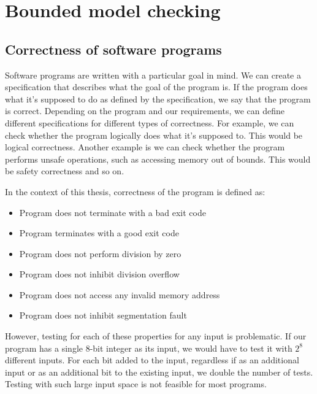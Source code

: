 \documentclass[12pt]{article}
\begin{document}
\section{Bounded model checking}

\subsection{Correctness of software programs}

Software programs are written with a particular goal in mind. We can create a 
specification that describes what the goal of the program is. If the program 
does what it's supposed to do as defined by the specification, we say that the
program is correct. Depending on the program and our requirements, we can define
different specifications for different types of correctness. For example, we can
check whether the program logically does what it's supposed to. This would be 
logical correctness. Another example is we can check whether the program
performs unsafe operations, such as accessing memory out of bounds. This would
be safety correctness and so on.

In the context of this thesis, correctness of the program is defined as:

\begin{itemize}
    \item Program does not terminate with a bad exit code
    \item Program terminates with a good exit code
    \item Program does not perform division by zero
    \item Program does not inhibit division overflow
    \item Program does not access any invalid memory address
    \item Program does not inhibit segmentation fault
\end{itemize}

However, testing for each of these properties for any input is problematic. If
our program has a single 8-bit integer as its input, we would have to test it 
with $2^{8}$ different inputs. For each bit added to the input, regardless
if as an additional input or as an additional bit to the existing input, we
double the number of tests. Testing with such large input space is not feasible
for most programs.
\end{document}
